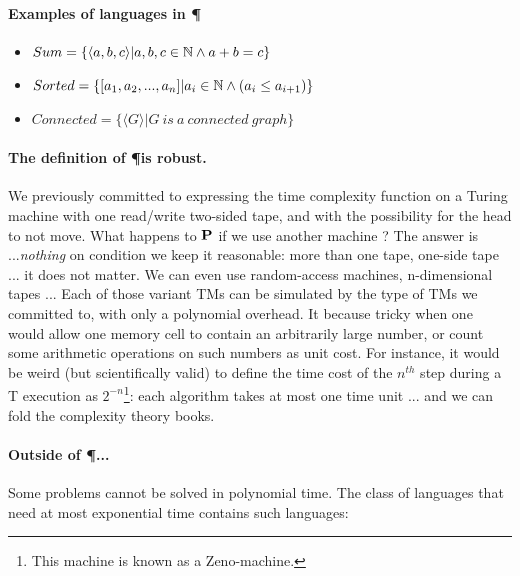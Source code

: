 
\paragraph{Examples of languages in \P}
\begin{itemize}
\item 
$Sum = \{\langle a,b,c \rangle| a,b,c \in \N \wedge a+b=c\}$
\item 
$Sorted = \{[a_1,a_2,...,a_n]| a_i \in \N \wedge (a_i \leq a_{i+1})\}$
\item 
$Connected = \{\langle G \rangle|G~is~a~connected~graph\}$
\end{itemize}

\paragraph{The definition of \P is robust.} 
We previously committed to expressing the time complexity function on
a Turing machine with one read/write two-sided tape, and with the
possibility for the head to not move. What happens to $\P$ if we use
another machine ? The answer is ...{\em nothing} on condition we keep
it reasonable: more than one tape, one-side tape ... it does not
matter. We can even use random-access machines, n-dimensional tapes
... Each of those variant TMs can be simulated by the type of TMs we
committed to, with only a polynomial overhead. It because tricky when
one would allow one memory cell to contain an arbitrarily large
number, or count some arithmetic operations on such numbers as unit
cost. For instance, it would be weird (but scientifically valid) to
define the time cost of the $n^{th}$ step during a T execution as
$2^{-n}$\footnote{This machine is known as a Zeno-machine.}: each
algorithm takes at most one time unit ... and we can fold the
complexity theory books.


\paragraph{Outside of \P ...} 
Some problems cannot be solved in polynomial time. The class of
languages that need at most exponential time contains such languages:


